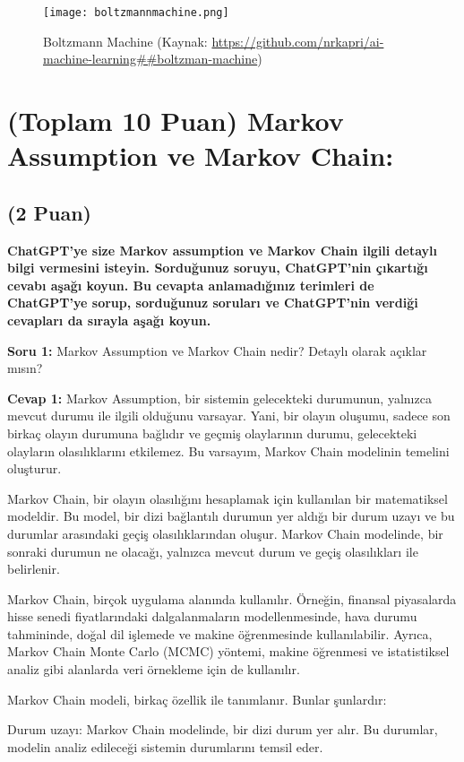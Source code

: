 \documentclass[11pt]{article}
\begin{document}
\begin{figure}[h]
  \centering
  \shorthandoff{=}
  \texttt{[image: boltzmannmachine.png]}
  \shorthandoff{=}
  \caption[Şekil 1]{Boltzmann Machine (Kaynak: \url{https://github.com/nrkapri/ai-machine-learning##boltzman-machine})}
  \label{fig:Şekil 1}
\end{figure}
\newpage
\section{(Toplam 10 Puan) Markov Assumption ve Markov Chain:}

\subsection{(2 Puan)} \textbf{ChatGPT’ye size Markov assumption ve Markov Chain ilgili detaylı bilgi vermesini isteyin. Sorduğunuz soruyu, ChatGPT'nin çıkartığı cevabı aşağı koyun. Bu cevapta anlamadığınız terimleri de ChatGPT’ye sorup, sorduğunuz soruları ve ChatGPT’nin verdiği cevapları da sırayla aşağı koyun.}


\textbf{Soru 1: } Markov Assumption ve Markov Chain nedir? Detaylı olarak açıklar mısın?

\textbf{Cevap 1: } Markov Assumption, bir sistemin gelecekteki durumunun, yalnızca mevcut durumu ile ilgili olduğunu varsayar. Yani, bir olayın oluşumu, sadece son birkaç olayın durumuna bağlıdır ve geçmiş olaylarının durumu, gelecekteki olayların olasılıklarını etkilemez. Bu varsayım, Markov Chain modelinin temelini oluşturur.

Markov Chain, bir olayın olasılığını hesaplamak için kullanılan bir matematiksel modeldir. Bu model, bir dizi bağlantılı durumun yer aldığı bir durum uzayı ve bu durumlar arasındaki geçiş olasılıklarından oluşur. Markov Chain modelinde, bir sonraki durumun ne olacağı, yalnızca mevcut durum ve geçiş olasılıkları ile belirlenir.

Markov Chain, birçok uygulama alanında kullanılır. Örneğin, finansal piyasalarda hisse senedi fiyatlarındaki dalgalanmaların modellenmesinde, hava durumu tahmininde, doğal dil işlemede ve makine öğrenmesinde kullanılabilir. Ayrıca, Markov Chain Monte Carlo (MCMC) yöntemi, makine öğrenmesi ve istatistiksel analiz gibi alanlarda veri örnekleme için de kullanılır.

Markov Chain modeli, birkaç özellik ile tanımlanır. Bunlar şunlardır:

Durum uzayı: Markov Chain modelinde, bir dizi durum yer alır. Bu durumlar, modelin analiz edileceği sistemin durumlarını temsil eder.
\end{document}
